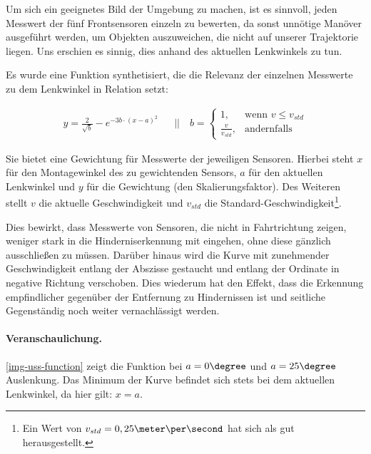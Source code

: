 \documentclass[a4paper,12pt]{report}
\begin{document}
	Um sich ein geeignetes Bild der Umgebung zu machen, ist es sinnvoll, jeden  Messwert der fünf Frontsensoren einzeln zu bewerten, da sonst unnötige Manöver ausgeführt werden, um Objekten auszuweichen, die nicht auf unserer Trajektorie liegen.
	Uns erschien es sinnig, dies anhand des aktuellen Lenkwinkels zu tun.

	Es wurde eine Funktion synthetisiert, die die Relevanz der einzelnen Messwerte zu dem Lenkwinkel in Relation setzt:

	\begin{align*}
		y=\frac{2}{\sqrt{b}} - e^{-3b \cdot \left( x-a \right)^2}
		&&||\quad b=
		\begin{cases} 
			1,					& \text{wenn } v \leq v_{std} \\
			\frac{v}{v_{std}}, 	& \text{andernfalls}
		\end{cases}
	\end{align*}


	Sie bietet eine Gewichtung für Messwerte der jeweiligen Sensoren.
	Hierbei steht $x$ für den Montagewinkel des zu gewichtenden Sensors, $a$ für den aktuellen Lenkwinkel und $y$ für die Gewichtung (den Skalierungsfaktor).
	Des Weiteren stellt $v$ die aktuelle Geschwindigkeit und $v_{std}$ die Standard-Geschwindigkeit\footnote{Ein Wert von $v_{std} = 0,25\meter\per\second$ hat sich als gut herausgestellt.}.

	Dies bewirkt, dass Messwerte von Sensoren, die nicht in Fahrtrichtung zeigen, weniger stark in die Hinderniserkennung mit eingehen, ohne diese gänzlich ausschließen zu müssen.
	Darüber hinaus wird die Kurve mit zunehmender Geschwindigkeit entlang der Abszisse gestaucht und entlang der Ordinate in negative Richtung verschoben.
	Dies wiederum hat den Effekt, dass die Erkennung empfindlicher gegenüber der Entfernung zu Hindernissen ist und seitliche Gegenständig noch weiter vernachlässigt werden.

	\paragraph{Veranschaulichung.} \autoref{img-uss-function} zeigt die Funktion bei $a = 0\degree$ und $a = 25\degree$ Auslenkung.
	Das Minimum der Kurve befindet sich stets bei dem aktuellen Lenkwinkel, da hier gilt: $x = a$.
\end{document}

